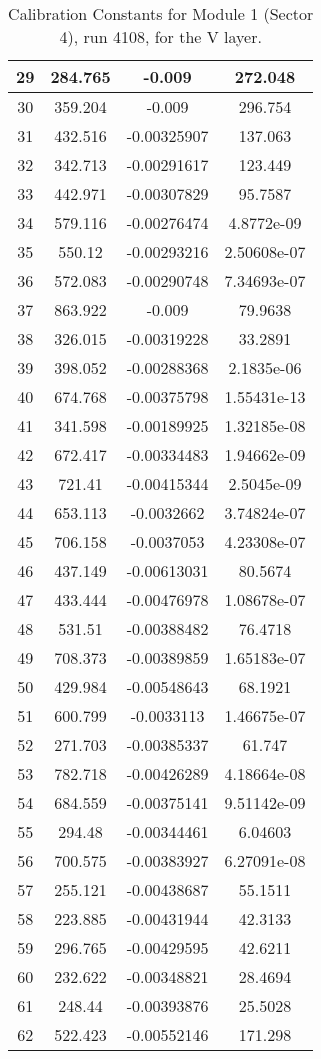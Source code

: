 \begin{table}[h]
{\begin{tabular}{|c|c|c|c|}
29	&	284.765	&	-0.009	&	272.048	\\	\hline
30	&	359.204	&	-0.009	&	296.754	\\	\hline
31	&	432.516	&	-0.00325907	&	137.063	\\	\hline
32	&	342.713	&	-0.00291617	&	123.449	\\	\hline
33	&	442.971	&	-0.00307829	&	95.7587	\\	\hline
34	&	579.116	&	-0.00276474	&	4.8772e-09	\\	\hline
35	&	550.12	&	-0.00293216	&	2.50608e-07	\\	\hline
36	&	572.083	&	-0.00290748	&	7.34693e-07	\\	\hline
37	&	863.922	&	-0.009	&	79.9638	\\	\hline
38	&	326.015	&	-0.00319228	&	33.2891	\\	\hline
39	&	398.052	&	-0.00288368	&	2.1835e-06	\\	\hline
40	&	674.768	&	-0.00375798	&	1.55431e-13	\\	\hline
41	&	341.598	&	-0.00189925	&	1.32185e-08	\\	\hline
42	&	672.417	&	-0.00334483	&	1.94662e-09	\\	\hline
43	&	721.41	&	-0.00415344	&	2.5045e-09	\\	\hline
44	&	653.113	&	-0.0032662	&	3.74824e-07	\\	\hline
45	&	706.158	&	-0.0037053	&	4.23308e-07	\\	\hline
46	&	437.149	&	-0.00613031	&	80.5674	\\	\hline
47	&	433.444	&	-0.00476978	&	1.08678e-07	\\	\hline
48	&	531.51	&	-0.00388482	&	76.4718	\\	\hline
49	&	708.373	&	-0.00389859	&	1.65183e-07	\\	\hline
50	&	429.984	&	-0.00548643	&	68.1921	\\	\hline
51	&	600.799	&	-0.0033113	&	1.46675e-07	\\	\hline
52	&	271.703	&	-0.00385337	&	61.747	\\	\hline
53	&	782.718	&	-0.00426289	&	4.18664e-08	\\	\hline
54	&	684.559	&	-0.00375141	&	9.51142e-09	\\	\hline
55	&	294.48	&	-0.00344461	&	6.04603	\\	\hline
56	&	700.575	&	-0.00383927	&	6.27091e-08	\\	\hline
57	&	255.121	&	-0.00438687	&	55.1511	\\	\hline
58	&	223.885	&	-0.00431944	&	42.3133	\\	\hline
59	&	296.765	&	-0.00429595	&	42.6211	\\	\hline
60	&	232.622	&	-0.00348821	&	28.4694	\\	\hline
61	&	248.44	&	-0.00393876	&	25.5028	\\	\hline
62	&	522.423	&	-0.00552146	&	171.298	\\	\hline
  \end{tabular}
        }
        \caption{Calibration Constants for Module 1 (Sector 4), run 4108, for the V layer.}
\end{table}


